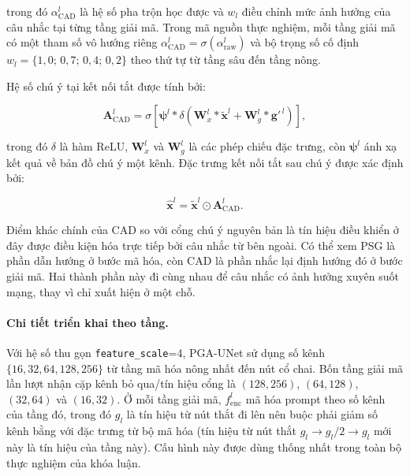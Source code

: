 trong đó $\alpha^{l}_{\mathrm{CAD}}$ là hệ số pha trộn học được và $w_l$ điều chỉnh mức ảnh hưởng của câu nhắc tại từng tầng giải mã. Trong mã nguồn thực nghiệm, mỗi tầng giải mã có một tham số vô hướng riêng $\alpha^{l}_{\mathrm{CAD}}=\sigma(\alpha^{l}_{\mathrm{raw}})$ và bộ trọng số cố định $w_l=\{1{,}0;\,0{,}7;\,0{,}4;\,0{,}2\}$ theo thứ tự từ tầng sâu đến tầng nông.

Hệ số chú ý tại kết nối tắt được tính bởi:

\begin{equation}
    \mathbf{A}^{l}_{\mathrm{CAD}}
    =
    \sigma
    \left[
        \boldsymbol{\psi}^{l}
        \ast
        \delta
        \left(
            \mathbf{W}^{l}_{x}\ast\widetilde{\mathbf{x}}^{l}
            +
            \mathbf{W}^{l}_{g}\ast\mathbf{g}'^{\,l}
        \right)
    \right],
    \label{eq:cad_attention}
\end{equation}

trong đó $\delta$ là hàm ReLU,
$\mathbf{W}^{l}_{x}$ và $\mathbf{W}^{l}_{g}$ là các phép chiếu đặc trưng, còn $\boldsymbol{\psi}^{l}$ ánh xạ kết quả về bản đồ chú ý một kênh. Đặc trưng kết nối tắt sau chú ý được xác định bởi:

\begin{equation}
    \widehat{\mathbf{x}}^{l}
    =
    \widetilde{\mathbf{x}}^{l}
    \odot
    \mathbf{A}^{l}_{\mathrm{CAD}}.
    \label{eq:cad_skip}
\end{equation}

Điểm khác chính của CAD so với cổng chú ý nguyên bản là tín hiệu điều khiển ở đây được điều kiện hóa trực tiếp bởi câu nhắc từ bên ngoài. Có thể xem PSG là phần dẫn hướng ở bước mã hóa, còn CAD là phần nhắc lại định hướng đó ở bước giải mã. Hai thành phần này đi cùng nhau để câu nhắc có ảnh hưởng xuyên suốt mạng, thay vì chỉ xuất hiện ở một chỗ.

\paragraph{Chi tiết triển khai theo tầng.}
Với hệ số thu gọn \texttt{feature\_scale}=4, PGA-UNet sử dụng số kênh $\{16,32,64,128,256\}$ từ tầng mã hóa nông nhất đến nút cổ chai. Bốn tầng giải mã lần lượt nhận cặp kênh bỏ qua/tín hiệu cổng là $(128,256)$, $(64,128)$, $(32,64)$ và $(16,32)$. Ở mỗi tầng giải mã, $f^{l}_{\mathrm{enc}}$ mã hóa prompt theo số kênh của tầng đó, trong đó $g_l$ là tín hiệu từ nút thắt đi lên nên buộc phải giảm số kênh bằng với đặc trưng từ bộ mã hóa (tín hiệu từ nút thắt $g_l \rightarrow g_l/2 \rightarrow g_l$ mới này là tín hiệu của tầng này). Cấu hình này được dùng thống nhất trong toàn bộ thực nghiệm của khóa luận.

